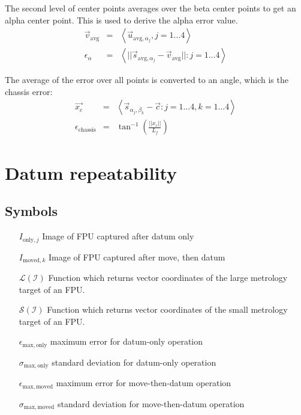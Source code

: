 \documentclass[11pt,a4paper,twoside]{scrartcl}
\begin{document}
The second level of center points averages over the beta center points
to get an alpha center point. This is used to derive the alpha error
value.
\begin{eqnarray}
  \vec{v}_\mathrm{avg} & = & \left< \vec{u}_{\mathrm{avg}, \alpha_j}, j = 1 \ldots 4 \right> \\
  \epsilon_\alpha & = & \left< ||\vec{s}_{\mathrm{avg}, \alpha_j} - \vec{v}_\mathrm{avg} || : j = 1 \ldots 4 \right>
\end{eqnarray}

The average of the error over all points is converted to an angle,
which is the chassis error:
\begin{eqnarray}
  \vec{x_c} & = &  \left< \vec{s}_{\alpha_j,\beta_k} - \vec{c} : j = 1 \ldots 4, k = 1 \ldots 4 \right> \\
  \epsilon_\mathrm{chassis} & = & \tan^{-1}\left(\frac{||x_c||}{L_f}\right)
\end{eqnarray}



\section{Datum repeatability}
\subsection{Symbols}
\begin{itemize}
\item[$I_{\mathrm{only},j}$] Image of FPU captured after datum only
\item[$I_{\mathrm{moved},k}$] Image of FPU captured after move, then datum
\item[$\mathcal{L(I)}$] Function which returns vector coordinates of
  the large metrology target of an FPU.
\item[$\mathcal{S(I)}$] Function which returns vector coordinates of
  the small metrology target of an FPU.

\item[$\epsilon_\mathrm{max,only}$] maximum error for datum-only operation
\item[$\sigma_\mathrm{max,only}$] standard deviation for datum-only operation
\item[$\epsilon_\mathrm{max,moved}$] maximum error for move-then-datum operation
\item[$\sigma_\mathrm{max,moved}$] standard deviation for move-then-datum operation


\end{itemize}
\end{document}
